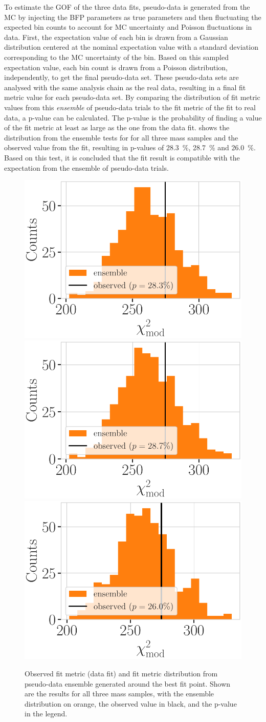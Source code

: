 To estimate the GOF of the three data fits, pseudo-data is generated from the MC by injecting the BFP parameters as true parameters and then fluctuating the expected bin counts to account for MC uncertainty and Poisson fluctuations in data. First, the expectation value of each bin is drawn from a Gaussian distribution centered at the nominal expectation value with a standard deviation corresponding to the MC uncertainty of the bin. Based on this sampled expectation value, each bin count is drawn from a Poisson distribution, independently, to get the final pseudo-data set. These pseudo-data sets are analysed with the same analysis chain as the real data, resulting in a final fit metric value for each pseudo-data set. By comparing the distribution of fit metric values from this \textit{ensemble} of pseudo-data trials to the fit metric of the fit to real data, a p-value can be calculated. The p-value is the probability of finding a value of the fit metric at least as large as the one from the data fit.  shows the distribution from the ensemble tests for for all three mass samples and the observed value from the fit, resulting in p-values of \SI{28.3}{\percent}, \SI{28.7}{\percent} and \SI{26.0}{\percent}. Based on this test, it is concluded that the fit result is compatible with the expectation from the ensemble of pseudo-data trials.

\begin{figure}[h]
    \includegraphics[width=0.32\linewidth]{figures/results/blind_fits/blind_fit_ensemble_comparison_0.3_GeV.pdf}
    \includegraphics[width=0.32\linewidth]{figures/results/blind_fits/blind_fit_ensemble_comparison_0.6_GeV.pdf}
    \includegraphics[width=0.32\linewidth]{figures/results/blind_fits/blind_fit_ensemble_comparison_1.0_GeV.pdf}
	\caption[Pseudo-data trials fit metric distributions]{Observed fit metric (data fit) and fit metric distribution from pseudo-data ensemble generated around the best fit point. Shown are the results for all three mass samples, with the ensemble distribution on orange, the observed value in black, and the p-value in the legend.}
\end{figure}


